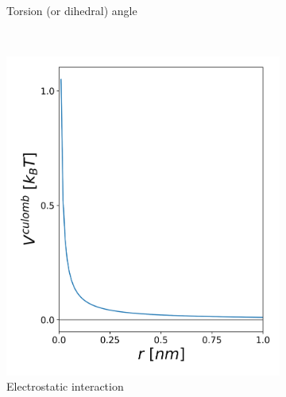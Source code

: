 \begin{figure}[h!]
\begin{subfigure}{0.45\textwidth}
        \caption{Torsion (or dihedral) angle}
	\label{sfig: tf}
    \end{subfigure}
    \\
        \begin{subfigure}{0.45\textwidth}
        \includegraphics[width=\textwidth]{2_chapter_intro/fig/ForceField/coulombV.png}
        \caption{Electrostatic interaction}
	\label{sfig: cf}
    \end{subfigure}
        \begin{subfigure}{0.45\textwidth}

\end{subfigure}
\end{figure}
